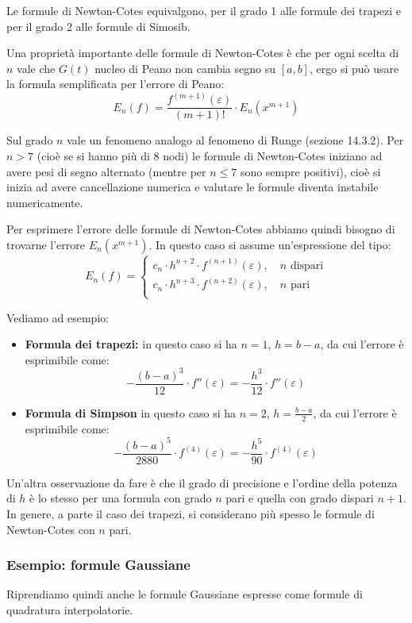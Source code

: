 \documentclass[a4paper,11pt]{article}
\begin{document}
Le formule di Newton-Cotes equivalgono, per il grado 1 alle formule dei trapezi e per il grado 2 alle formule di Simosib.

Una proprietà importante delle formule di Newton-Cotes è che per ogni scelta di $n$ vale che $G(t)$ nucleo di Peano non cambia segno su $[a ,b]$, ergo si può usare la formula semplificata per l'errore di Peano:
$$
E_n(f) = \frac{f^{(m + 1)} (\varepsilon)}{(m + 1)!} \cdot E_n(x^{m + 1})
$$

Sul grado $n$ vale un fenomeno analogo al fenomeno di Runge (sezione 14.3.2).
Per $n > 7$ (cioè se si hanno più di $8$ nodi) le formule di Newton-Cotes iniziano ad avere pesi di segno alternato (mentre per $n \leq 7$ sono sempre positivi), cioè si inizia ad avere cancellazione numerica e valutare le formule diventa instabile numericamente.

Per esprimere l'errore delle formule di Newton-Cotes abbiamo quindi bisogno di trovarne l'errore $E_n(x^{m + 1})$.
In questo caso si assume un'espressione del tipo:
$$
E_n(f) =
\begin{cases}
	c_n \cdot h^{n + 2} \cdot f^{(n + 1)} (\varepsilon), \quad n \text{ dispari} \\			
	c_n \cdot h^{n + 3} \cdot f^{(n + 2)} (\varepsilon), \quad n \text{ pari} \\			
\end{cases}
$$

Vediamo ad esempio:
\begin{itemize}
	\item \textbf{Formula dei trapezi:} in questo caso si ha $n = 1$, $h = b - a$, da cui l'errore è esprimibile come:
		$$
		- \frac{(b - a)^3}{12} \cdot f''(\varepsilon) = -\frac{h^3}{12} \cdot f''(\varepsilon)
		$$
	\item \textbf{Formula di Simpson} in questo caso si ha $n = 2$, $h = \frac{b - a}{2}$, da cui l'errore è esprimibile come:
		$$
		- \frac{(b - a)^5}{2880} \cdot f^{(4)}(\varepsilon) = -\frac{h^5}{90} \cdot f^{(4)}(\varepsilon)
		$$
\end{itemize}

Un'altra osservazione da fare è che il grado di precisione e l'ordine della potenza di $h$ è lo stesso per una formula con grado $n$ pari e quella con grado dispari $n + 1$.
In genere, a parte il caso dei trapezi, si considerano più spesso le formule di Newton-Cotes con $n$ pari.

\subsubsection{Esempio: formule Gaussiane}
Riprendiamo quindi anche le formule Gaussiane espresse come formule di quadratura interpolatorie.
\end{document}
